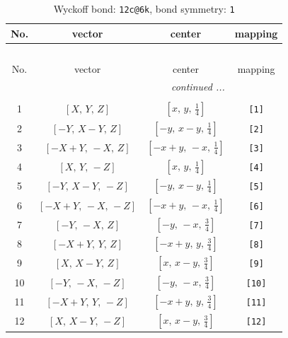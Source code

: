 \documentclass[fleqn,8pt]{jsarticle}
\begin{document}
\begin{longtable}{cccc}
\caption{Wyckoff bond: {\tt 12c@6k}, bond symmetry: {\tt 1}}
 \\
 \hline \hline
No. & vector & center & mapping \\ \hline \endfirsthead

\multicolumn{3}{l}{\tablename\ \thetable{}} \\
 \hline \hline
No. & vector & center & mapping \\ \hline \endhead

 \hline \hline
\multicolumn{3}{r}{\footnotesize\it continued ...} \\ \endfoot

 \hline \hline
\multicolumn{3}{r}{} \\ \endlastfoot

1 & $\left[ X,\, Y,\, Z \right]$ & $\left[ x,\, y,\, \frac{1}{4} \right]$ & {\tt [1]} \\ \hline
2 & $\left[ - Y,\, X - Y,\, Z \right]$ & $\left[ - y,\, x - y,\, \frac{1}{4} \right]$ & {\tt [2]} \\ \hline
3 & $\left[ - X + Y,\, - X,\, Z \right]$ & $\left[ - x + y,\, - x,\, \frac{1}{4} \right]$ & {\tt [3]} \\ \hline
4 & $\left[ X,\, Y,\, - Z \right]$ & $\left[ x,\, y,\, \frac{1}{4} \right]$ & {\tt [4]} \\ \hline
5 & $\left[ - Y,\, X - Y,\, - Z \right]$ & $\left[ - y,\, x - y,\, \frac{1}{4} \right]$ & {\tt [5]} \\ \hline
6 & $\left[ - X + Y,\, - X,\, - Z \right]$ & $\left[ - x + y,\, - x,\, \frac{1}{4} \right]$ & {\tt [6]} \\ \hline
7 & $\left[ - Y,\, - X,\, Z \right]$ & $\left[ - y,\, - x,\, \frac{3}{4} \right]$ & {\tt [7]} \\ \hline
8 & $\left[ - X + Y,\, Y,\, Z \right]$ & $\left[ - x + y,\, y,\, \frac{3}{4} \right]$ & {\tt [8]} \\ \hline
9 & $\left[ X,\, X - Y,\, Z \right]$ & $\left[ x,\, x - y,\, \frac{3}{4} \right]$ & {\tt [9]} \\ \hline
10 & $\left[ - Y,\, - X,\, - Z \right]$ & $\left[ - y,\, - x,\, \frac{3}{4} \right]$ & {\tt [10]} \\ \hline
11 & $\left[ - X + Y,\, Y,\, - Z \right]$ & $\left[ - x + y,\, y,\, \frac{3}{4} \right]$ & {\tt [11]} \\ \hline
12 & $\left[ X,\, X - Y,\, - Z \right]$ & $\left[ x,\, x - y,\, \frac{3}{4} \right]$ & {\tt [12]} \\
\end{longtable}
\end{document}
